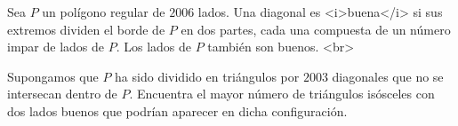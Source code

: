 Sea $P$ un polígono regular de $2006$ lados. Una diagonal es <i>buena</i> si sus extremos dividen el borde de $P$ en dos partes, cada una compuesta de un número impar de lados de $P$. Los lados de $P$ también son buenos. <br>

Supongamos que $P$ ha sido dividido en triángulos por $2003$ diagonales que no se intersecan dentro de $P$. Encuentra el mayor número de triángulos isósceles con dos lados buenos que podrían aparecer en dicha configuración.